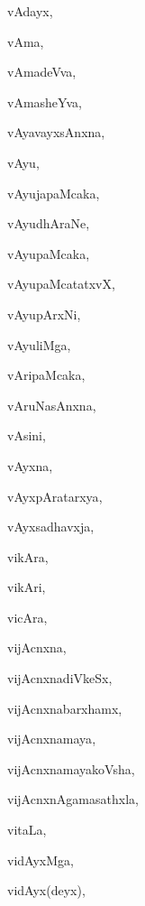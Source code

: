 \begin{multicols}{3}
{\noindent
{vAdayx}, \pageref{vAdayx}

\noindent
{vAma}, \pageref{vAma}

\noindent
{vAmadeVva}, \pageref{vAmadeVva}

\noindent
{vAmasheYva}, \pageref{vAmasheYva}

\noindent
{vAyavayxsAnxna}, \pageref{vAyavayxsAnxna}

\noindent
{vAyu}, \pageref{vAyu}

\noindent
{vAyujapaMcaka}, \pageref{vAyujapaMcaka}

\noindent
{vAyudhAraNe}, \pageref{vAyudhAraNe}

\noindent
{vAyupaMcaka}, \pageref{vAyupaMcaka}

\noindent
{vAyupaMcatatxvX}, \pageref{vAyupaMcatatxvX}

\noindent
{vAyupArxNi}, \pageref{vAyupArxNi}

\noindent
{vAyuliMga}, \pageref{vAyuliMga}

\noindent
{vAripaMcaka}, \pageref{vAripaMcaka}

\noindent
{vAruNasAnxna}, \pageref{vAruNasAnxna}

\noindent
{vAsini}, \pageref{vAsini}

\noindent
{vAyxna}, \pageref{vAyxna}

\noindent
{vAyxpAratarxya}, \pageref{vAyxpAratarxya}

\noindent
{vAyxsadhavxja}, \pageref{vAyxsadhavxja}

\noindent
{vikAra}, \pageref{vikAra}

\noindent
{vikAri}, \pageref{vikAri}

\noindent
{vicAra}, \pageref{vicAra}

\noindent
{vijAcnxna}, \pageref{vijAcnxna}

\noindent
{vijAcnxnadiVkeSx}, \pageref{vijAcnxnadiVkeSx}

\noindent
{vijAcnxnabarxhamx}, \pageref{vijAcnxnabarxhamx}

\noindent
{vijAcnxnamaya}, \pageref{vijAcnxnamaya}

\noindent
{vijAcnxnamayakoVsha}, \pageref{vijAcnxnamayakoVsha}

\noindent
{vijAcnxnAgamasathxla}, \pageref{vijAcnxnAgamasathxla}

\noindent
{vitaLa}, \pageref{vitaLa}

\noindent
{vidAyxMga}, \pageref{vidAyxMga}

\noindent
{vidAyx(deyx)}, \pageref{vidAyxdeyx}

}
\end{multicols}
